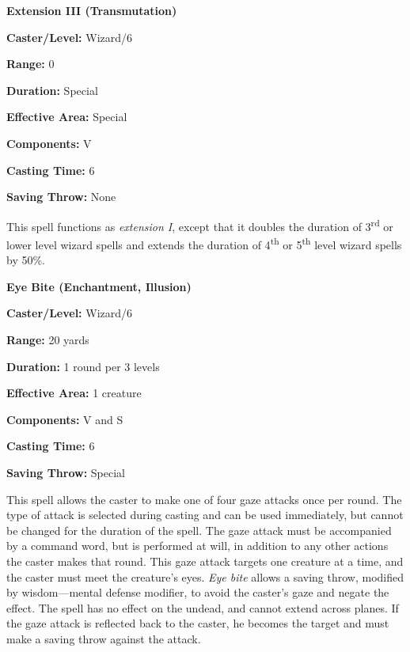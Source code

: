 \begin{multicols}{2}
\vspace{1em}

\noindent
\begin{minipage}{\columnwidth}

\noindent \textbf{Extension III (Transmutation)}

\noindent \textbf{Caster/Level:} Wizard/6

\noindent \textbf{Range:} 0

\noindent \textbf{Duration:} Special

\noindent \textbf{Effective Area:} Special

\noindent \textbf{Components:} V

\noindent \textbf{Casting Time:} 6

\noindent \textbf{Saving Throw:} None

\end{minipage}

This spell functions as \textit{extension I}, except that it doubles the duration of 3\textsuperscript{rd} or lower level wizard spells and extends the duration of 4\textsuperscript{th} or 5\textsuperscript{th} level wizard spells by 50\%.

\vspace{1em}

\noindent
\begin{minipage}{\columnwidth}

\noindent \textbf{Eye Bite (Enchantment, Illusion)}

\noindent \textbf{Caster/Level:} Wizard/6

\noindent \textbf{Range:} 20 yards

\noindent \textbf{Duration:} 1 round per 3 levels

\noindent \textbf{Effective Area:} 1 creature

\noindent \textbf{Components:} V and S

\noindent \textbf{Casting Time:} 6

\noindent \textbf{Saving Throw:} Special

\end{minipage}

This spell allows the caster to make one of four gaze attacks once per round.  The type of attack is selected during casting and can be used immediately, but cannot be changed for the duration of the spell.  The gaze attack must be accompanied by a command word, but is performed at will, in addition to any other actions the caster makes that round.  This gaze attack targets one creature at a time, and the caster must meet the creature's eyes.  \textit{Eye bite} allows a saving throw, modified by wisdom---mental defense modifier, to avoid the caster's gaze and negate the effect.  The spell has no effect on the undead, and cannot extend across planes.  If the gaze attack is reflected back to the caster, he becomes the target and must make a saving throw against the attack.


\end{multicols}
